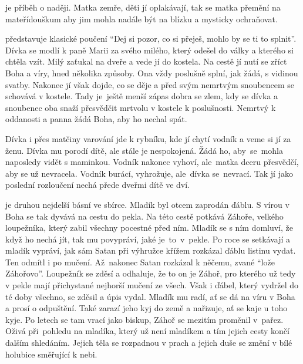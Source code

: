 \documentclass[FGBook.tex]{subfiles}
\begin{document}


{\setlength{\parindent}{5pt}
 je příběh o naději. Matka zemře, děti jí oplakávají, tak se matka přemění na mateřídouškum aby jim mohla nadále být na blízku a mysticky ochraňovat.

 představuje klasické poučení \enquote{Dej si pozor, co si přeješ, mohlo by se ti to splnit}. Dívka se modlí k paně Marii za svého milého, který odešel do války a kterého si chtěla vzít. Milý zaťukal na dveře a vede jí do kostela. Na cestě jí nutí se zříct Boha a víry, hned několika způsoby. Ona vždy poslušně splní, jak žádá, s vidinou svatby. Nakonec jí však dojde, co se děje a před svým nemrtvým snoubencem se schovává v kostele. Tady je~ještě menší zápas dobra se zlem, kdy se dívka a snoubenec oba snaží přesvědčit mrtvolu v kostele k poslušnosti. Nemrtvý k oddanosti a panna žádá Boha, aby ho nechal spát.

 Dívka i přes matčiny varování jde k rybníku, kde jí chytí vodník a veme si jí za ženu. Dívka mu porodí dítě, ale stále je nespokojená. Žádá ho, aby~se~mohla naposledy vidět s maminkou. Vodník nakonec vyhoví, ale~matka dceru přesvědčí, aby se už nevracela. Vodník burácí, vyhrožuje, ale~dívka se~nevrací. Tak jí jako poslední rozloučení nechá přede dveřmi dítě ve dví.

 je druhou nejdelší básní ve sbírce. Mladík byl otcem zaprodán ďáblu. S vírou v Boha se tak dyvává na cestu do pekla. Na této cestě potkává Záhoře, velkého loupežníka, který zabil všechny pocestné před ním. Mladík se s ním domluví, že když ho nechá jít, tak mu povypráví, jaké je~to~v~pekle. Po roce se setkávají a mladík vypráví, jak sám Satan při výhružce křížem rozkázal ďáblu listinu vydat. Ten odmítl i po mučení. Až~nakonec Satan rozkázal k něčemu, zvané \enquote{lože Záhořovo}. Loupežník se zděsí a odhaluje, že to on je Záhoř, pro kterého už tedy v pekle mají přichystané nejhorší mučení ze všech. Však i ďábel, který vydržel do té doby všechno, se zděsil a úpis vydal. Mladík mu radí, ať se dá na víru v Boha a prosí o odpuštění. Také zarazí jeho kyj do země a nařizuje, ať se kaje u toho kyje. Po letech se tam vrací jako biskup, Záhoř se mezitím proměnil v~pařez. Oživá při~pohledu na mladíka, který už není mladíkem a tím jejich cesty končí dalším shledáním. Jejich těla se rozpadnou v prach a jejich duše se změní v bílé holubice směřující k nebi.
}\\
\end{document}

